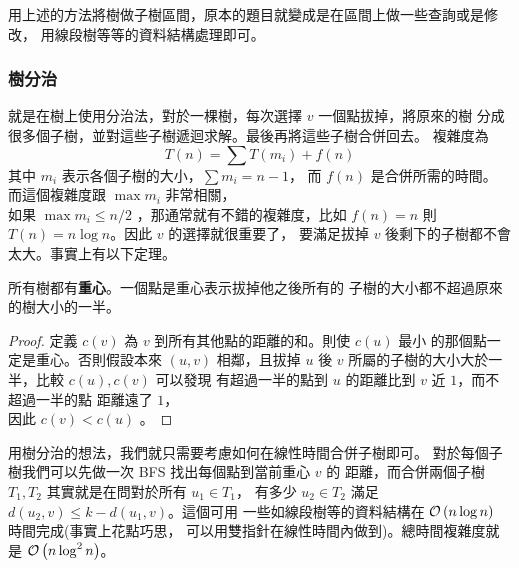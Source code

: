 \documentclass[a4paper,12pt]{book}
\begin{document}
用上述的方法將樹做子樹區間，原本的題目就變成是在區間上做一些查詢或是修改，
用線段樹等等的資料結構處理即可。

\subsubsection{樹分治}
就是在樹上使用分治法，對於一棵樹，每次選擇 $v$ 一個點拔掉，將原來的樹
分成很多個子樹，並對這些子樹遞迴求解。最後再將這些子樹合併回去。
複雜度為
\begin{equation}
  T(n) = \sum T(m_i) + f(n)
\end{equation}
其中 $m_i$ 表示各個子樹的大小，$\sum m_i = n - 1$，
而 $f(n)$ 是合併所需的時間。
而這個複雜度跟 $\max m_i$ 非常相關，\\
如果 $\max m_i \leq n / 2$ ，那通常就有不錯的複雜度，比如
$f(n) = n$ 則 $T(n) = n \log n$。因此 $v$ 的選擇就很重要了，
要滿足拔掉 $v$ 後剩下的子樹都不會太大。事實上有以下定理。

\begin{theorem}
  所有樹都有{\bf 重心}。一個點是重心表示拔掉他之後所有的
  子樹的大小都不超過原來的樹大小的一半。
\end{theorem}
\begin{proof}
  定義 $c(v)$ 為 $v$ 到所有其他點的距離的和。則使 $c(u)$ 最小
  的那個點一定是重心。否則假設本來 $(u, v)$ 相鄰，且拔掉 $u$ 
  後 $v$ 所屬的子樹的大小大於一半，比較 $c(u), c(v)$ 可以發現
  有超過一半的點到 $u$ 的距離比到 $v$ 近 $1$，而不超過一半的點
  距離遠了 $1$，\\因此 $c(v) < c(u)$ \contradict。
\end{proof}

用樹分治的想法，我們就只需要考慮如何在線性時間合併子樹即可。
對於每個子樹我們可以先做一次 BFS 找出每個點到當前重心 $v$ 的
距離，而合併兩個子樹 $T_1, T_2$ 其實就是在問對於所有 $u_1 \in T_1$，
有多少 $u_2 \in T_2$ 滿足 $d(u_2, v) \leq k - d(u_1, v)$。這個可用
一些如線段樹等的資料結構在 $\operatorname{\mathcal{O}}\left(n \log n\right)$ 時間完成(事實上花點巧思，
可以用雙指針在線性時間內做到)。總時間複雜度就是 $\operatorname{\mathcal{O}}\left(n \log^2 n\right)$。
\end{document}
